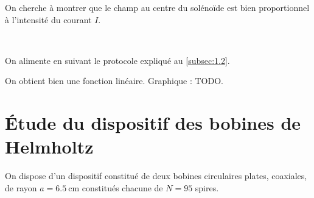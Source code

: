 \documentclass[a4paper,french,bookmarks]{article}
\begin{document}
    On cherche à montrer que le champ au centre du solénoïde est bien proportionnel à l'intensité du courant $I$.

        \noafter
    \nobefore\yesafter
    \begin{expcom}\text{}\\
        \begin{enumerate}
            \itt On alimente en suivant le protocole expliqué au \ref{subsec:1.2}.
            
            \itt On obtient bien une fonction linéaire. Graphique : TODO.
        \end{enumerate}
    \end{expcom}
    \yesbefore
    
    \section{Étude du dispositif des bobines de Helmholtz}
    
    On dispose d’un dispositif constitué de deux bobines circulaires plates, coaxiales, de rayon $a = \SI{6.5}{\cm}$ constitués chacune de $N = 95$ spires.
    
\end{document}

